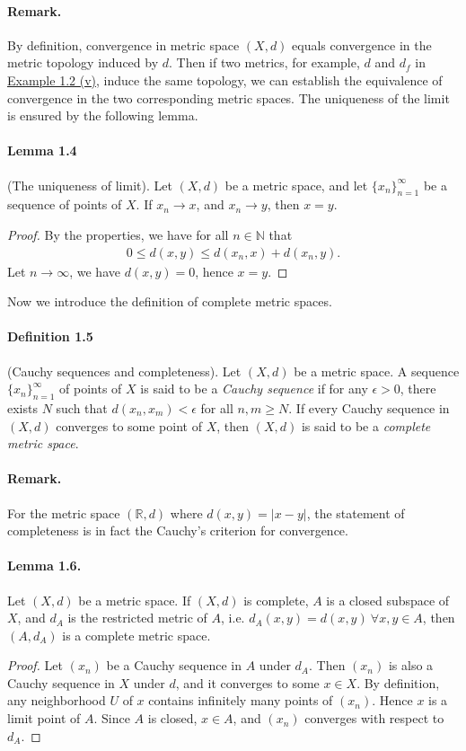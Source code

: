 \documentclass{article}
\begin{document}
\paragraph{Remark.} By definition, convergence in metric space $(X,d)$ equals convergence in the metric topology induced by $d$. Then if two metrics, for example, $d$ and $d_f$ in \hyperref[example:1.2]{Example 1.2 (v)}, induce the same topology, we can establish the equivalence of convergence in the two corresponding metric spaces. The uniqueness of the limit is ensured by the following lemma.

\paragraph{Lemma 1.4\label{lemma:1.4}} (The uniqueness of limit). Let $(X,d)$ be a metric space, and let $\{x_n\}_{n=1}^\infty$ be a sequence of points of $X$. If $x_n\to x$, and $x_n\to y$, then $x=y$.
\begin{proof}
By the properties, we have for all $n\in\mathbb{N}$ that
\begin{align*}
	0\leq d(x,y) \leq d(x_n,x) + d(x_n,y).
\end{align*}
Let $n\to \infty$, we have $d(x,y)=0$, hence $x=y$.
\end{proof}

Now we introduce the definition of complete metric spaces.

\paragraph{Definition 1.5\label{def:1.5}} (Cauchy sequences and completeness). Let $(X,d)$ be a metric space. A sequence $\{x_n\}_{n=1}^\infty$ of points of $X$ is said to be a \textit{Cauchy sequence} if for any $\epsilon > 0$, there exists $N$ such that $d(x_n,x_m) < \epsilon$ for all $n,m\geq N$. If every Cauchy sequence in $(X,d)$ converges to some point of $X$, then $(X,d)$ is said to be a \textit{complete metric space}.

\paragraph{Remark.} For the metric space $(\mathbb{R},d)$ where $d(x,y)=\vert x-y\vert$, the statement of completeness is in fact the Cauchy's criterion for convergence.

\paragraph{Lemma 1.6.\label{lemma:1.6}} Let $(X,d)$ be a metric space.
If $(X,d)$ is complete, $A$ is a closed subspace of $X$, and $d_A$ is the restricted metric of $A$, i.e. $d_A(x,y)=d(x,y)\ \forall x,y\in A$, then $(A,d_A)$ is a complete metric space.
\begin{proof}
Let $(x_n)$ be a Cauchy sequence in $A$ under $d_A$. Then $(x_n)$ is also a Cauchy sequence in $X$ under $d$, and it converges to some $x\in X$. By definition, any neighborhood $U$ of $x$ contains infinitely many points of $(x_n)$. Hence $x$ is a limit point of $A$. Since $A$ is closed, $x\in A$, and $(x_n)$ converges with respect to $d_A$.
\end{proof}
\end{document}
